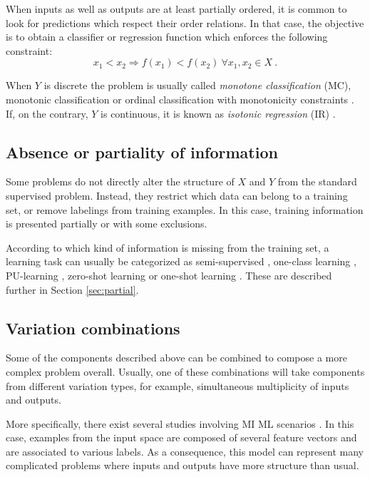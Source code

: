 \documentclass[
	fontsize=11pt, %
	twoside=false, %
	open=any, %
	secnumdepth=1, %
]{kaobook}
\begin{document}
When inputs as well as outputs are at least partially ordered, it is common to look for predictions which respect their order relations. In that case, the objective is to obtain a classifier or regression function which enforces the following constraint:
\begin{equation}
x_1<x_2\Rightarrow f(x_1)<f(x_2)~\forall x_1,x_2\in X~.
\end{equation}

When $Y$ is discrete the problem is usually called \emph{monotone classification} (MC), monotonic classification or ordinal classification with monotonicity constraints \cite{mc-salva}. If, on the contrary, $Y$ is continuous, it is known as \emph{isotonic regression} (IR) \cite{ir-book}.

\subsection{Absence or partiality of information}

Some problems do not directly alter the structure of $X$ and $Y$ from the standard supervised problem. Instead, they restrict which data can belong to a training set, or remove labelings from training examples. In this case, training information is presented partially or with some exclusions.

According to which kind of information is missing from the training set, a learning task  can usually be categorized as semi-supervised \cite{semi-sup}, one-class learning \cite{oneclass}, PU-learning \cite{pu-learn}, zero-shot learning \cite{zeroshot} or one-shot learning \cite{oneshot}. These are described further in Section \ref{sec:partial}.

\subsection{Variation combinations}

Some of the components described above can be combined to compose a more complex problem overall. Usually, one of these combinations will take components from different variation types, for example, simultaneous multiplicity of inputs and outputs. 

More specifically, there exist several studies involving MI ML scenarios \cite{miml,miml2}. In this case, examples from the input space are composed of several feature vectors and are associated to various labels. As a consequence, this model can represent many complicated problems where inputs and outputs have more structure than usual.
\end{document}

